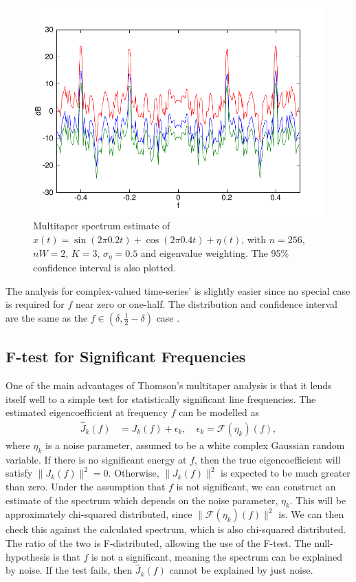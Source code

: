 \begin{figure}
    \centering
    \includegraphics[width=4.75in]{pics/conf_int256.pdf}
    \caption[Confidence interval example]{Multitaper \textcolor{blue!80!black}{spectrum estimate} of $x(t)=\sin(2\pi0.2t)+\cos(2\pi0.4t) + \eta(t)$, with $n=256$, $nW=2$, $K=3$, $\sigma_\eta=0.5$ and eigenvalue weighting.  The 95\% confidence interval is also plotted. \label{fig:conf_int}}
\end{figure}

The analysis for complex-valued time-series' is slightly easier since no special case is required for $f$ near zero or one-half.  The distribution and confidence interval are the same as the $f\in(\delta, \tfrac{1}{2}-\delta)$ case \cite{percival:multitaper}.

\subsection{F-test for Significant Frequencies \label{sec:ftest}} 

One of the main advantages of Thomson's multitaper analysis is that it lends itself well to a simple test for statistically significant line frequencies.  The estimated eigencoefficient at frequency $f$ can be modelled as
\begin{align}
    \hat{J}_k(f) & = J_k(f) + \epsilon_k, \quad \epsilon_k=\mathcal{F}(\eta_k)(f),
\end{align}
where $\eta_k$ is a noise parameter, assumed to be a white complex Gaussian random variable.  If there is no significant energy at $f$, then the true eigencoefficient will satisfy $\|J_k(f)\|^2=0$.  Otherwise, $\|J_k(f)\|^2$ is expected to be much greater than zero.  Under the assumption that $f$ is not significant, we can construct an estimate of the spectrum which depends on the noise parameter, $\eta_k$.  This will be approximately chi-squared distributed, since $\|\mathcal{F}(\eta_k)(f)\|^2$ is.  We can then check this against the calculated spectrum, which is also chi-squared distributed.  The ratio of the two is F-distributed, allowing the use of the F-test.  The null-hypothesis is that $f$ is not a significant, meaning the spectrum can be explained by noise.  If the test fails, then $\hat{J}_k(f)$ cannot be explained by just noise.

